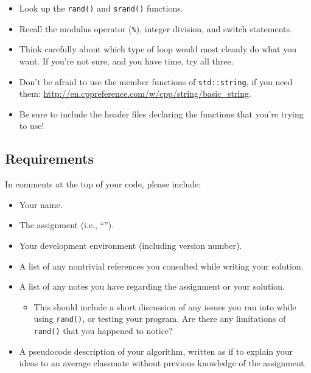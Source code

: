 \documentclass[12pt,letterpaper]{article}
\begin{document}
\begin{itemize}
  \item Look up the \lstinline{rand()} and \lstinline{srand()} functions.
  \item Recall the modulus operator (\lstinline{%}), integer division, and
      switch statements.
  \item Think carefully about which type of loop would most cleanly do what you
    want.  If you're not sure, and you have time, try all three.
  \item Don't be afraid to use the member functions of \lstinline{std::string},
    if you need them:
    \url{http://en.cppreference.com/w/cpp/string/basic_string}.
  \item Be sure to include the header files declaring the functions that you're
    trying to use!
\end{itemize}


\filbreak
\subsection*{Requirements}

In comments at the top of your code, please include:
\begin{itemize}
  \item Your name.
  \item The assignment (i.e., ``\docTitle'').
  \item Your development environment (including version number).
  \item A list of any nontrivial references you consulted while writing your
    solution.
  \item A list of any notes you have regarding the assignment or your solution.
    \begin{itemize}
      \item This should include a short discussion of any issues you ran into
        while using \lstinline{rand()}, or testing your program.  Are there any
        limitations of \lstinline{rand()} that you happened to notice?
    \end{itemize}
  \item A pseudocode description of your algorithm, written as if to explain
    your ideas to an average classmate without previous knowledge of the
    assignment.
\end{itemize}
\end{document}
